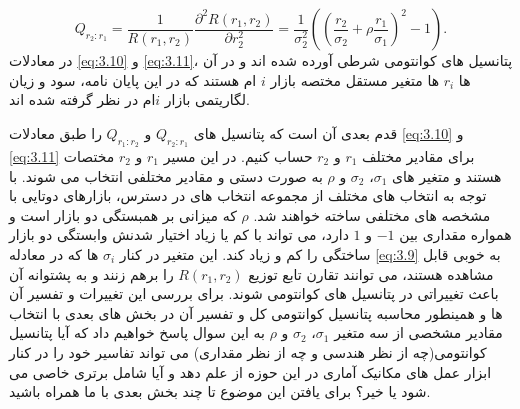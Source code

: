 \documentclass[a4paper,titlepage,12pt,fleqn,oneside]{report}
\begin{document}
	\begin{equation}
		Q_{r_2:r_1}  = \frac{1}{R(r_1,r_2)}\frac{\partial^2 R(r_1,r_2)}{\partial r_2^2}  = \frac{1}{\sigma_2^2}\left(\left(\frac{r_2}{\sigma_2} + \rho\frac{r_1}{\sigma_1}\right)^2-1\right).
		\label{eq:3.11}
	\end{equation}
	در معادلات 
	\ref{eq:3.10}
	و
	\ref{eq:3.11}،
	پتانسیل های کوانتومی شرطی آورده شده اند و در آن ها 
	$r_i$
	ها متغیر مستقل مختصه بازار $i$ ام هستند که در این پایان نامه، سود و زیان لگاریتمی بازار $i$ام در نظر گرفته شده اند.
	
	قدم بعدی آن است که پتانسیل های 
	$Q_{r_2:r_1}$
	و
	$Q_{r_1:r_2}$
	را طبق معادلات 
	\ref{eq:3.10}
	و
	\ref{eq:3.11}
	برای مقادیر مختلف 
	$r_1$
	و
	$r_2$
	حساب کنیم. در این مسیر 
	$r_1$
	و
	$r_2$
	مختصات هستند و متغیر های 
	$\sigma_1$،
	$\sigma_2$
	و
	$\rho$
	به صورت دستی و مقادیر مختلفی انتخاب می شوند. با توجه به انتخاب های مختلف از مجموعه انتخاب های در دسترس،  بازارهای دوتایی با مشخصه های مختلفی ساخته خواهند شد. 
	$\rho$
	که میزانی بر همبستگی دو بازار است و همواره مقداری بین 
	$-1$
	و 
	$1$
	دارد، می تواند با کم یا زیاد اختیار شدنش وابستگی دو بازار ساختگی را کم و زیاد کند. 
	این متغیر در کنار 
	$\sigma_i$
	ها که در معادله 
	\ref{eq:3.9}
	به خوبی قابل مشاهده هستند، می توانند تقارن تابع توزیع
	$R(r_1,r_2)$
	را برهم زنند و به پشتوانه آن باعث تغییراتی در پتانسیل های کوانتومی شوند. برای بررسی این تغییرات و تفسیر آن ها و همینطور محاسبه پتانسیل کوانتومی کل و تفسیر آن در بخش های بعدی با انتخاب مقادیر مشخصی از سه متغیر
	$\sigma_1$،
	$\sigma_2$
	و
	$\rho$
	به این سوال پاسخ خواهیم داد که آیا پتانسیل کوانتومی(چه از نظر هندسی و چه از نظر مقداری) می تواند تفاسیر خود را در کنار ابزار عمل های مکانیک آماری در این حوزه از علم دهد و آیا شامل برتری خاصی می شود یا خیر؟ برای یافتن این موضوع تا چند بخش بعدی با ما همراه باشید.
\end{document}
